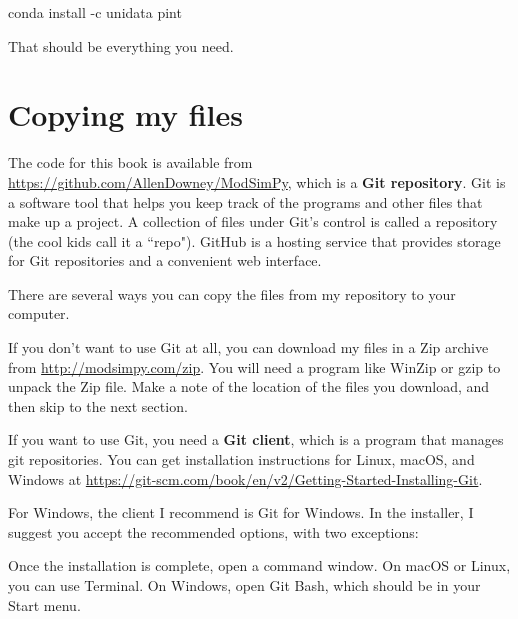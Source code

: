\documentclass[12pt]{book}
\theoremstyle{exercise}
\newcommand{\py}{\verb}%}
\begin{document}
\begin{code}
conda install -c unidata pint
\end{code}

That should be everything you need.


\section*{Copying my files}

The code for this book is available from
\url{https://github.com/AllenDowney/ModSimPy}, which is a {\bf Git repository}.  Git is a software tool that helps you keep track of the programs and other files that make up a project.  A collection of files under Git's control is called a repository (the cool kids call it a ``repo").  GitHub is a hosting service that provides storage for Git repositories and a convenient web interface.


There are several ways you can copy the files from my repository to your computer.

If you don't want to use Git at all, you can download my files
in a Zip archive from \url{http://modsimpy.com/zip}.  You will need a program like WinZip or gzip to unpack the Zip file.  Make a note of the location of the files you download, and then skip to the next section.

If you want to use Git, you need a {\bf Git client}, which is a program that manages git repositories.  You can get installation instructions for Linux, macOS, and Windows at \url{https://git-scm.com/book/en/v2/Getting-Started-Installing-Git}. 

For Windows, the client I recommend is Git for Windows.  In the installer, I suggest you accept the recommended options, with two exceptions:


Once the installation is complete, open a command window.  On macOS or Linux, you can use Terminal.  On Windows, open Git Bash, which should be in your Start menu.
\end{document}
